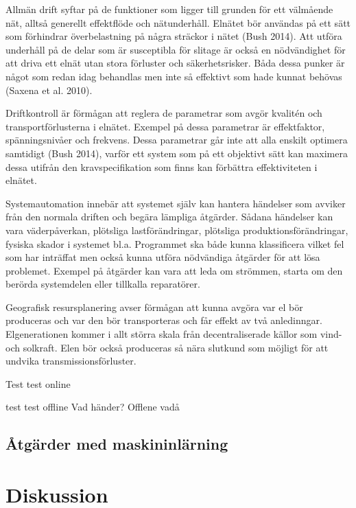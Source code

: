 \documentclass[a4paper]{article}
\begin{document}
Allmän drift syftar på de funktioner som ligger till grunden för ett välmående nät, alltså generellt effektflöde och nätunderhåll. Elnätet bör användas på ett sätt som förhindrar överbelastning på några sträckor i nätet (Bush 2014). Att utföra underhåll på de delar som är susceptibla för slitage är också en nödvändighet för att driva ett elnät utan stora förluster och säkerhetsrisker. Båda dessa punker är något som redan idag behandlas men inte så effektivt som hade kunnat behövas (Saxena et al. 2010). 

Driftkontroll är förmågan att reglera de parametrar som avgör kvalitén och transportförlusterna i elnätet. Exempel på dessa parametrar är effektfaktor, spänningsnivåer och frekvens. Dessa parametrar går inte att alla enskilt optimera samtidigt (Bush 2014), varför ett system som på ett objektivt sätt kan maximera dessa utifrån den kravspecifikation som finns kan förbättra effektiviteten i elnätet.

Systemautomation innebär att systemet själv kan hantera händelser som avviker från den normala driften och begära lämpliga åtgärder. Sådana händelser kan vara väderpåverkan, plötsliga lastförändringar, plötsliga produktionsförändringar, fysiska skador i systemet bl.a. Programmet ska både kunna klassificera vilket fel som har inträffat men också kunna utföra nödvändiga åtgärder för att lösa problemet. Exempel på åtgärder kan vara att leda om strömmen, starta om den berörda systemdelen eller tillkalla reparatörer. 

Geografisk resursplanering avser förmågan att kunna avgöra var el bör produceras och var den bör transporteras och får effekt av två anledinngar. Elgenerationen kommer i allt störra skala från decentraliserade källor som vind- och solkraft. Elen bör också produceras så nära slutkund som möjligt för att undvika transmissionsförluster.


Test test online

test test offline Vad händer? Offlene vadå

\clearpage 



\subsection{Åtgärder med maskininlärning}

\clearpage



\section{Diskussion}
\end{document}
